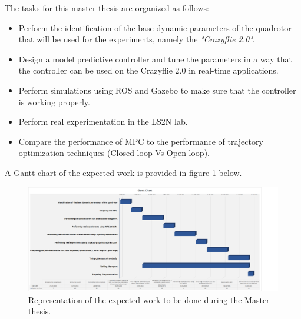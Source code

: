 \documentclass{thesisreport}
\begin{document}
The tasks for this master thesis are organized as follows:

\begin{itemize}
	\item Perform the identification of the base dynamic parameters of the quadrotor that will be used for the experiments, namely the \textit{"Crazyflie 2.0"}.
	\item Design a model predictive controller and tune the parameters in a way that the controller can be used on the Crazyflie 2.0 in real-time applications.
	\item Perform simulations using ROS and Gazebo to make sure that the controller is working properly.
	\item Perform real experimentation in the LS2N lab.
	\item Compare the performance of MPC to the performance of trajectory optimization techniques (Closed-loop Vs Open-loop).
\end{itemize}
A Gantt chart of the expected work is provided in figure \ref{Gantt_Chart} below.
\newpage




\begin{figure}[h]
\centering
\includegraphics[width=\textwidth]{Images/Planning/Gantt Chart}
\caption{Representation of the expected work to be done during the Master thesis.}
\label{Gantt_Chart}
\end{figure}



 \nocite{*}
 
 


 
\end{document}

